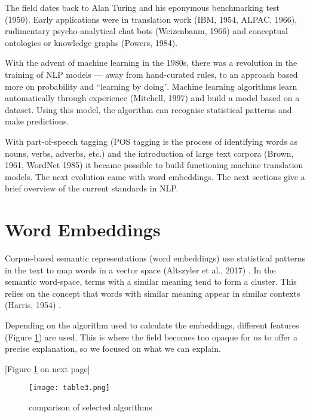 \documentclass[12pt, usenames, dvipsnames]{report}
\begin{document}
\begin{flushleft}
The field dates back to Alan Turing and his eponymous benchmarking test (1950)\cite{turing1950}.
Early applications were in translation work (IBM, 1954, ALPAC, 1966)\cite{hutchins2004}\cite{committee1966language}, rudimentary psycho-analytical chat bots (Weizenbaum, 1966)\cite{weizenbaum1966} and conceptual ontologies or knowledge graphs (Powers, 1984)\cite{powers1984}.

With the advent of machine learning in the 1980s, there was a revolution in the training of NLP models --- away from hand-curated rules, to an approach based more on probability and “learning by doing”. Machine learning algorithms learn automatically through experience (Mitchell, 1997) \cite{mitchell1997} and build a model based on a dataset.
Using this model, the algorithm can recognise statistical patterns and make predictions.

With part-of-speech tagging (POS tagging is the process of identifying words as nouns, verbs, adverbs, etc.) and the introduction of large text corpora (Brown, 1961, WordNet 1985) \cite{brown1979} \cite{wordnet1995} it became possible to build functioning machine translation models.
The next evolution came with word embeddings.
The next sections give a brief overview of the current standards in NLP.


\section{Word Embeddings}

Corpus-based semantic representations (word embeddings) use statistical patterns in the text to map words in a vector space (Altszyler et al., 2017) \cite{altszyler2017}.
In the semantic word-space, terms with a similar meaning tend to form a cluster.
This relies on the concept that words with similar meaning appear in similar contexts (Harris, 1954) \cite{harris1954}.

Depending on the algorithm used to calculate the embeddings, different features (Figure \ref{tab:table3}) are used.
This is where the field becomes too opaque for us to offer a precise explanation, so we focused on what we can explain.

[Figure \ref{tab:table3} on next page]

\vspace*{1.2em}
\begin{figure}[!htbp]
  \hspace*{-3.666em}
  \texttt{[image: table3.png]}
  \caption{comparison of selected algorithms}
  \label{tab:table3}
\end{figure}
\vspace*{1.2em}


\end{flushleft}
\end{document}
